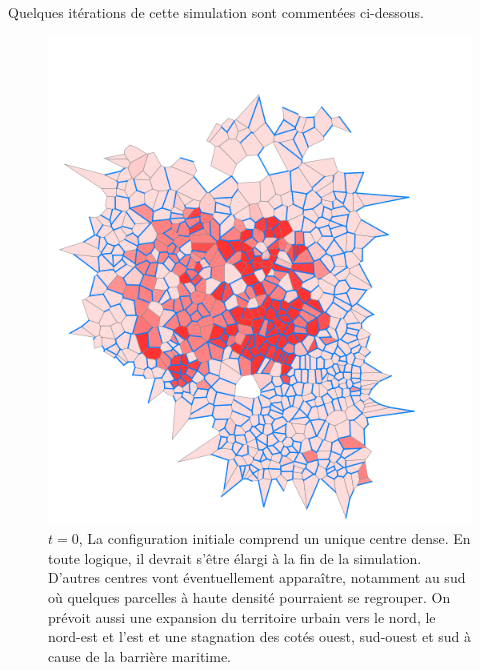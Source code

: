 \documentclass[10pt]{article}
\begin{document}
Quelques itérations de cette simulation sont commentées ci-dessous.

\begin{figure}[H]
  \centering
  \includegraphics[width=.8\linewidth]{images/lh_0.png}
  \caption{$t = 0$, La configuration initiale comprend un unique
    centre dense. En toute logique, il devrait s'être élargi à la fin
    de la simulation. D'autres centres vont éventuellement apparaître,
    notamment au sud où quelques parcelles à haute densité pourraient
    se regrouper. On prévoit aussi une expansion du territoire urbain
    vers le nord, le nord-est et l'est et une stagnation des cotés
    ouest, sud-ouest et sud à cause de la barrière maritime.}
  \label{fig:lh_0}
\end{figure}
\end{document}
